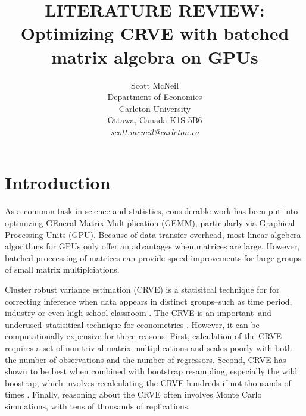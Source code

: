 \documentclass[11pt]{article}       %
\begin{document}


\title{LITERATURE REVIEW: Optimizing CRVE with batched matrix algebra on GPUs}


\author{
Scott McNeil\\
Department of Economics\\
Carleton University\\
Ottawa, Canada K1S 5B6\\
{\em scott.mcneil@carleton.ca}
} %

\maketitle



\section{Introduction} \label{intro}

As a common task in science and statistics, considerable work has been put into optimizing GEneral Matrix Multiplication (GEMM), particularly via Graphical Processing Units (GPU). Because of data transfer overhead, most linear algebera algorithms for GPUs only offer an advantages when matrices are large. However, batched proccessing of matrices can provide speed improvements for large groups of small matrix multiplciations\cite{masliah2016high}.

Cluster robust variance estimation (CRVE) is a statisitcal technique for for correcting inference when data appears in distinct groups--such as time period, industry or even high school classroom . The CRVE is an important--and underused--statisitical technique for econometrics \cite{moulton1990illustration}. However, it can be computationally expensive for three reasons. First, calculation of the CRVE requires a set of non-trivial matrix multiplications and scales poorly with both the number of observations and the number of regressors. Second, CRVE has shown to be best when combined with bootstrap resampling, especially the wild boostrap, which involves recalculating the CRVE hundreds if not thousands of times \cite{cameron2008bootstrap}. Finally, reasoning about the CRVE often involves Monte Carlo simulations, with tens of thousands of replications.
\end{document}
